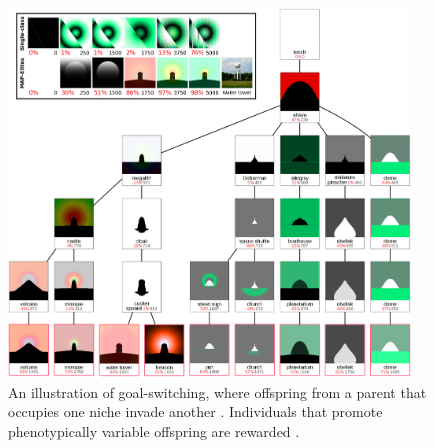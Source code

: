 \begin{figure}
    \centering
    \begin{columns}
    \begin{column}{0.7\textwidth}
     \includegraphics[width=\textwidth]{img/ie_phylogenetic_tree_combined}
    \end{column}
    \begin{column}{0.3\textwidth}
   	\captionsetup{singlelinecheck=off,justification=raggedright}
  	\caption{An illustration of goal-switching, where offspring from a parent that occupies one niche invade another \cite[Figure 9]{Nguyen2015InnovationLearning}. Individuals that promote phenotypically variable offspring are rewarded \cite{Mengistu2016EvolvabilityIt}.}
    \label{fig:goal_switching}
    \end{column}
    \end{columns}
   

\end{figure}